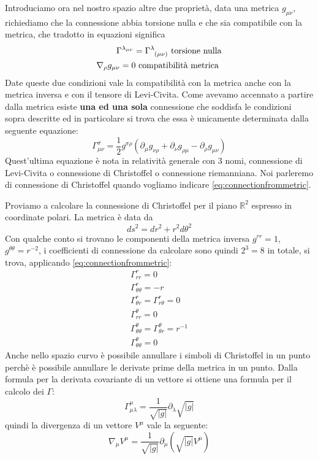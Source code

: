 \documentclass[twoside]{article}
\begin{document}
Introduciamo ora nel nostro spazio altre due proprietà, data una metrica $g_{\mu \nu}$, richiediamo che la connessione abbia torsione nulla e che sia compatibile con la metrica, che tradotto in equazioni significa
\begin{align}
	\Gamma^{\lambda_{\mu \nu}} = \Gamma\indices{^\lambda_{(\mu \nu)}} \textrm{ torsione nulla}\nonumber \\
	\nabla_{\rho} g_{\mu \nu }  = 0 \textrm{ compatibilità metrica }\nonumber
\end{align}
Date queste due condizioni vale la compatibilità con la metrica anche con la metrica inversa e con il tensore di Levi-Civita.
Come avevamo accennato a partire dalla metrica esiste \textbf{una ed una sola} connessione che soddisfa le condizioni sopra descritte ed in particolare si trova che essa è unicamente determinata dalla seguente equazione:
\begin{equation}\label{eq:connectionfrommetric}
\boxed{\Gamma^{\sigma}_{\mu \nu} = \frac{1}{2}g^{\sigma \rho} \left( 
\partial_{\mu} g_{\nu \rho} + \partial_{\nu} g_{\rho \mu} - \partial_\rho g_{\mu \nu}
\right) }
\end{equation}
Quest'ultima equazione è nota in relatività generale con 3 nomi, connessione di Levi-Civita o connessione di Christoffel o connessione riemanniana. Noi parleremo di connessione di Christoffel quando vogliamo indicare \ref{eq:connectionfrommetric}.

Proviamo a calcolare la connessione di Christoffel per 	il piano $\mathbb{R}^2$ espresso in coordinate polari. La metrica è data da 
\begin{equation}
	ds^2 = dr^2 + r^2 d\theta^2
\end{equation}
Con qualche conto si trovano le componenti della metrica inversa $g^{rr}=1$, $g^{\theta \theta}=r^{-2}$, i coefficienti di connessione da calcolare sono quindi $2^3=8$ in totale, si trova, applicando \ref{eq:connectionfrommetric}:
\begin{align}
	\Gamma^{r}_{rr} = 0 \\
	\Gamma^{r}_{\theta \theta} = -r \\
	\Gamma^r_{\theta r }=\Gamma^r_{r \theta}=0 \\
	\Gamma^{\theta}_{r r} = 0 \\
	\Gamma^{\theta}_{\theta \theta } = \Gamma^{\theta}_{\theta r} = r^{-1} \\
	\Gamma^{\theta}_{\theta \theta } = 0
\end{align}
Anche nello spazio curvo è possibile annullare i simboli di Christoffel in un punto perchè è possibile annullare le derivate prime della metrica in un punto. Dalla formula per la derivata covariante di un vettore si ottiene una formula per il calcolo dei $\Gamma$:
\begin{equation}
	\Gamma^{\mu}_{\mu \lambda } = \frac{1}{\sqrt{|g|}}\partial_{\lambda}\sqrt{|g|}
\end{equation}
quindi la divergenza di un vettore $V^{\mu}$ vale la seguente:
\begin{equation}\label{eq:vectordivergence}
	\nabla_{\mu} V^{\mu} = \frac{1}{\sqrt{|g|}}\partial_\mu (\sqrt{|g|} V^{\mu})
\end{equation}
\end{document}
